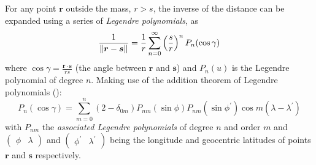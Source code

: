 For any point $\bm{r}$ outside the mass, $r > s$, the inverse of the distance can 
be expanded using a series of \emph{Legendre polynomials}, as
\begin{equation}
  \frac{1}{\lVert\bm{r}-\bm{s}\rVert} = \frac{1}{r} \sum_{n=0}^{\infty} 
    \left( \frac{s}{r} \right) ^n  P_n ( \cos \gamma )
\end{equation}
where $\cos \gamma = \frac{\bm{r} \cdot \bm{s}}{rs}$ (the angle between $\bm{r}$
and $\bm{s}$) and $P_n(u)$ is the Legendre polynomial of degree $n$. Making use of 
the addition theorem of Legendre polynomials (\cite{Montenbruck2000}):
\begin{equation}
  \label{eq:mont38}
  P_n (\cos \gamma ) = \sum_{m=0}^{n} \left( 2 - \delta _{0m} \right) 
    P_{nm} (\sin \phi ) P_{nm} (\sin{\phi ^\prime}) 
    \cos{m \left( \lambda - \lambda ^\prime \right) }
\end{equation}
with $P_{nm}$ the \emph{associated Legendre polynomials} of degree $n$ and order 
$m$ and $\begin{pmatrix} \phi & \lambda \end{pmatrix}$ and 
$\begin{pmatrix} \phi ^\prime & \lambda ^\prime \end{pmatrix}$ being the longitude 
and geocentric latitudes of points $\bm{r}$ and $\bm{s}$ respectively.

